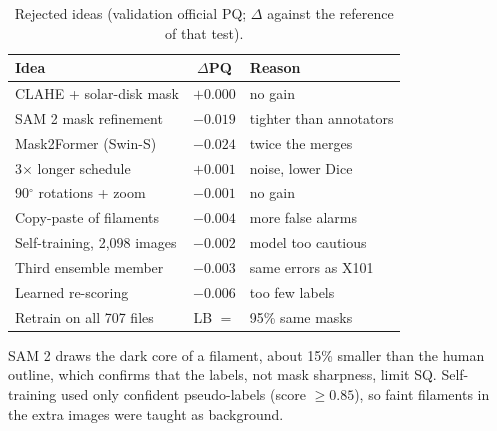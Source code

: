 \begin{table}[t]
\centering
\caption{Rejected ideas (validation official PQ; $\Delta$ against the reference of that test).}
\label{tab:negative}
\small
\begin{tabular}{@{}lcl@{}}
\hline
Idea & $\Delta$PQ & Reason \\
\hline
CLAHE + solar-disk mask      & $+0.000$ & no gain \\                    %
SAM 2 mask refinement        & $-0.019$ & tighter than annotators \\    %
Mask2Former (Swin-S)         & $-0.024$ & twice the merges \\           %
3$\times$ longer schedule    & $+0.001$ & noise, lower Dice \\          %
90$^\circ$ rotations + zoom  & $-0.001$ & no gain \\                    %
Copy-paste of filaments      & $-0.004$ & more false alarms \\          %
Self-training, 2,098 images  & $-0.002$ & model too cautious \\         %
Third ensemble member        & $-0.003$ & same errors as X101 \\        %
Learned re-scoring           & $-0.006$ & too few labels \\             %
Retrain on all 707 files     & LB $=$   & 95\% same masks \\            %
\hline
\end{tabular}
\end{table}

SAM 2 draws the dark core of a filament, about 15\% smaller than the human outline, which confirms that the labels,
not mask sharpness, limit SQ. Self-training used only confident pseudo-labels (score $\geq 0.85$), so faint
filaments in the extra images were taught as background.

